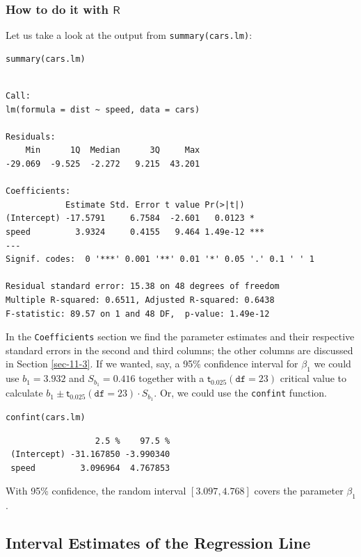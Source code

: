 \documentclass[captions=tableheading]{scrbook}
\begin{document}
\subsubsection{How to do it with \(\mathsf{R}\)}
\label{sec-11-2-4-1}




Let us take a look at the output from \texttt{summary(cars.lm)}:


\begin{verbatim}
summary(cars.lm)
\end{verbatim}


\begin{verbatim}

Call:
lm(formula = dist ~ speed, data = cars)

Residuals:
    Min      1Q  Median      3Q     Max 
-29.069  -9.525  -2.272   9.215  43.201 

Coefficients:
            Estimate Std. Error t value Pr(>|t|)    
(Intercept) -17.5791     6.7584  -2.601   0.0123 *  
speed         3.9324     0.4155   9.464 1.49e-12 ***
---
Signif. codes:  0 '***' 0.001 '**' 0.01 '*' 0.05 '.' 0.1 ' ' 1 

Residual standard error: 15.38 on 48 degrees of freedom
Multiple R-squared: 0.6511,	Adjusted R-squared: 0.6438 
F-statistic: 89.57 on 1 and 48 DF,  p-value: 1.49e-12
\end{verbatim}

In the \texttt{Coefficients} section we find the parameter estimates and their respective standard errors in the second and third columns; the other columns are discussed in Section \ref{sec-11-3}. If we wanted, say, a 95\% confidence interval for \(\beta_{1}\) we could use \( b_{1} =  3.932 \) and \( S_{b_{1}} =  0.416 \) together with a \( \mathsf{t}_{0.025}(\mathtt{df}=23) \) critical value to calculate \( b_{1} \pm \mathsf{t}_{0.025}(\mathtt{df} = 23) \cdot S_{b_{1}} \).  Or, we could use the \texttt{confint} function.


\begin{verbatim}
confint(cars.lm)
\end{verbatim}

\begin{verbatim}
                  2.5 %    97.5 %
 (Intercept) -31.167850 -3.990340
 speed         3.096964  4.767853
\end{verbatim}

With 95\% confidence, the random interval \( [  3.097,  4.768 ] \) covers the parameter \(\beta_{1}\).
\subsection{Interval Estimates of the Regression Line}
\label{sec-11-2-5}
\label{sub-slr-interval-est-regline}
\end{document}
